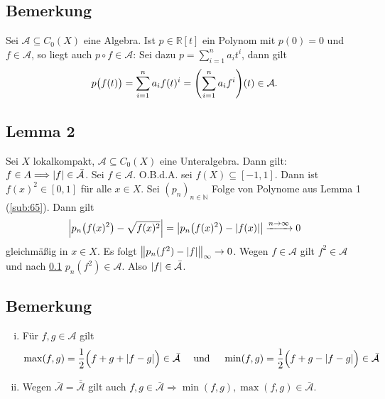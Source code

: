 \subsection[Bemerkung: Komposition mit Polynomen ist auch in einer Algebra $\mathcal{A} \subseteq C_0(X)$]{Bemerkung} %
\label{sub:66}
Sei $\mathcal{A} \subseteq C_0(X)$ eine Algebra. Ist $p \in \mathds{R}[t]$ ein Polynom mit $p(0)=0$ und $f \in \mathcal{A}$, so liegt auch $p \circ f \in \mathcal{A}$:
Sei dazu $p= \sum_{i=1}^{n} a_i t^i$, dann gilt 
\[
	p\enbrace[\big]{f(t)} = \sum_{i=1}^{n} a_i f(t)^i = \enbrace*{\sum_{i=1}^{n} a_i f^i} (t) \in \mathcal{A}. 
\]

\subsection[Lemma 2: Betrag von $f \in \mathcal{A}$ liegt in $\bar{\mathcal{A}}$]{Lemma 2} %
\label{sub:67}
Sei $X$ lokalkompakt, $\mathcal{A} \subseteq C_0(X)$ eine Unteralgebra. Dann gilt: $f \in A \Longrightarrow \abs*{f} \in \bar{\mathcal{A}}$.
Sei $f \in \mathcal{A}$. O.B.d.A. sei $f(X) \subseteq [{-1},1]$. Dann ist $f(x)^2 \in [0,1]$ für alle $x \in X$. Sei $(p_n)_{n \in \mathds{N}}$ Folge von Polynome aus 
Lemma 1 (\ref{sub:65}). Dann gilt
\begin{align*}
	\abs*{p_n \enbrace*{f(x)^2} - \sqrt{f(x)^2}} = \abs*{ p_n \enbrace*{f(x)^2} - \abs*{f(x)}} \xrightarrow{n \to \infty}  0 
\end{align*}
gleichmäßig in $x \in X$. Es folgt $\norm[\infty]{p_n(f^2) - \abs*{f} } \to 0 $. Wegen $f \in \mathcal{A} $ gilt $f^2 \in \mathcal{A}$ und nach \ref{sub:66} $p_n(f^2) \in \mathcal{A}$.
Also $\abs*{f} \in \bar{\mathcal{A}}$. \bewende

\subsection[Bemerkung: $\max, \min$ von Funktionen aus $\mathcal{A}$ liegen in $\bar{\mathcal{A}}$]{Bemerkung} %
\label{sub:68}
\begin{enumerate}[(i)]
	\item Für $f,g \in \mathcal{A}$ gilt
	\[
		\max(f,g) = \frac{1}{2} \enbrace[\Big]{f+g + \abs*{f-g}} \in\bar{\mathcal{A}} \quad \text{ und } \quad\min(f,g) = \frac{1}{2} \enbrace[\Big]{f+g - \abs*{f-g} } \in 
		\bar{\mathcal{A}}
	\]
	\item Wegen $\bar{\mathcal{A} } = \bar{\bar{\mathcal{A}}}$ gilt auch 
	$f,g \in \bar{\mathcal{A}} \Rightarrow \min(f,g), \max(f,g) \in \bar{\mathcal{A}}$. 
\end{enumerate}

